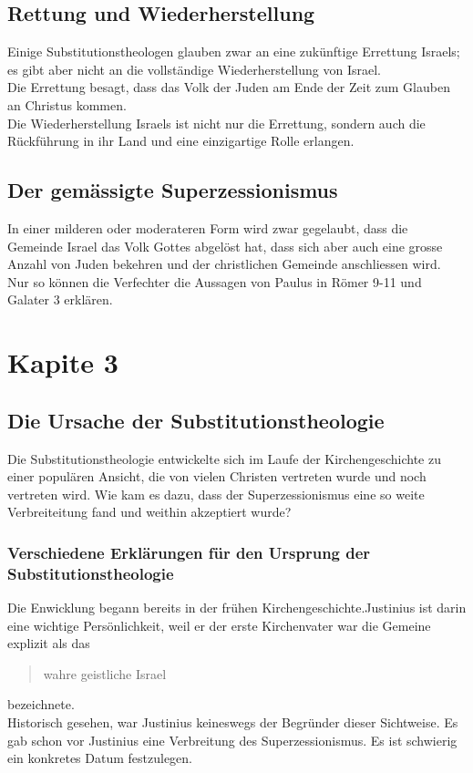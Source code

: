 \documentclass{../../inc/mybib}
\newcommand{\st}{Substitutionstheolog}
\newcommand{\sz}{Superzessionismus}
\begin{document}
    \subsection{Rettung und Wiederherstellung}
    Einige \st en glauben zwar an eine zukünftige Errettung Israels; es gibt aber nicht an die vollständige Wiederherstellung von Israel.\\
    Die Errettung besagt, dass das Volk der Juden am Ende der Zeit zum Glauben an Christus kommen.\\
    Die Wiederherstellung Israels ist nicht nur die Errettung, sondern auch die Rückführung in ihr Land und eine einzigartige Rolle erlangen.

    \subsection{Der gemässigte \sz}
    In einer milderen oder moderateren Form wird zwar gegelaubt, dass die Gemeinde Israel das Volk Gottes abgelöst hat, dass sich aber auch eine grosse Anzahl von Juden bekehren und der christlichen Gemeinde anschliessen wird.\\
    Nur so können die Verfechter die Aussagen von Paulus in Römer 9-11 und Galater 3 erklären.
    \section{Kapite 3}
    \subsection{Die Ursache der \st ie}
    Die \st ie entwickelte sich im Laufe der Kirchengeschichte zu einer populären Ansicht, die von vielen Christen vertreten wurde und noch vertreten wird. Wie kam es dazu, dass der \sz{} eine so weite Verbreiteitung fand und weithin akzeptiert wurde?
    \subsubsection{Verschiedene Erklärungen für den Ursprung der \st ie}
    Die Enwicklung begann bereits in der frühen Kirchengeschichte.Justinius ist darin eine wichtige Persönlichkeit, weil er der erste Kirchenvater war die Gemeine explizit als das \blockquote{wahre geistliche Israel} bezeichnete.\\
    Historisch gesehen, war Justinius keineswegs der Begründer dieser Sichtweise. Es gab schon vor Justinius eine Verbreitung des \sz. Es ist schwierig ein konkretes Datum festzulegen.
\end{document}
